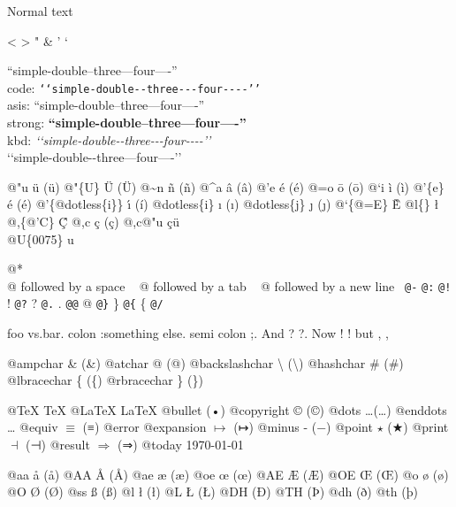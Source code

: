 \documentclass{book}
\newcommand\Texinfocommandstyletextkbd[1]{{\ttfamily\textsl{#1}}}%
\renewcommand{\_}{\Texinfounderscore\discretionary{}{}{}}
\begin{document}
Normal text

<
>
"
\&
'
`

``simple-double--three---four----''\leavevmode{}\\
code: \texttt{{`}{`}simple-double{-}{-}three{-}{-}{-}four{-}{-}{-}-{'}{'}} \leavevmode{}\\
asis: ``simple-double--three---four----'' \leavevmode{}\\
strong: \textbf{``simple-double--three---four----''} \leavevmode{}\\
kbd: \Texinfocommandstyletextkbd{{`}{`}simple-double{-}{-}three{-}{-}{-}four{-}{-}{-}-{'}{'}} \leavevmode{}\\

`\hbox{}`simple-double-\hbox{}-three---four----'\hbox{}'\leavevmode{}\\

%
%
%
%

@"u \"{u} (ü)
@"\{U\} \"{U} (Ü) 
@\~{}n \~{n} (ñ)
@\^{}a \^{a} (â)
@'e \'{e} (é)
@=o \={o} (ō)
@`i \`{i} (ì)
@'\{e\} \'{e} (é)
@'\{@dotless\{i\}\} \'{\i{}} (í)
@dotless\{i\} \i{} (ı)
@dotless\{j\} \j{} (ȷ)
@`\{@=E\} \`{\={E}}
@l\{\} \l{}
@,\{@'C\} \c{\'{C}}
@,c \c{c} (ç)
@,c@"u \c{c}\"{u} \leavevmode{}\\

@U\{0075\} u

@* \leavevmode{}\\
@ followed by a space
\ {}
@ followed by a tab
\ {}
@ followed by a new line
\ {}\texttt{@-} \-{}
\texttt{@:} \@
\texttt{@!} \@!
\texttt{@?} \@?
\texttt{@.} \@.
\texttt{@@} @
\texttt{@\}} \}
\texttt{@\{} \{
\texttt{@/} 

foo vs.\@ bar. 
colon :\@And something else.
semi colon ;\@.
And ? ?\@.
Now ! !\@@
but , ,\@

@ampchar \& (\&)
@atchar @ (@)
@backslashchar \textbackslash{} (\textbackslash{})
@hashchar \# (\#)
@lbracechar \{ (\{)
@rbracechar \} (\})

@TeX \TeX{}
@LaTeX \LaTeX{}
@bullet \textbullet{} (•)
@copyright \copyright{} (©)
@dots \dots{}\@ (…)
@enddots \dots{}
@equiv $\equiv{}$ (≡)
@error 
@expansion $\mapsto{}$ (↦)
@minus - (−)
@point $\star{}$ (★)
@print $\dashv{}$ (⊣)
@result $\Rightarrow{}$ (⇒)
@today \today{}

@aa \aa{} (å)
@AA \AA{} (Å)
@ae \ae{} (æ)
@oe \oe{} (œ)
@AE \AE{} (Æ)
@OE \OE{} (Œ)
@o \o{} (ø)
@O \O{} (Ø)
@ss \ss{} (ß)
@l \l{} (ł)
@L \L{} (Ł)
@DH \DH{} (Ð)
@TH \TH{} (Þ)
@dh \dh{} (ð)
@th \th{} (þ)
\end{document}
